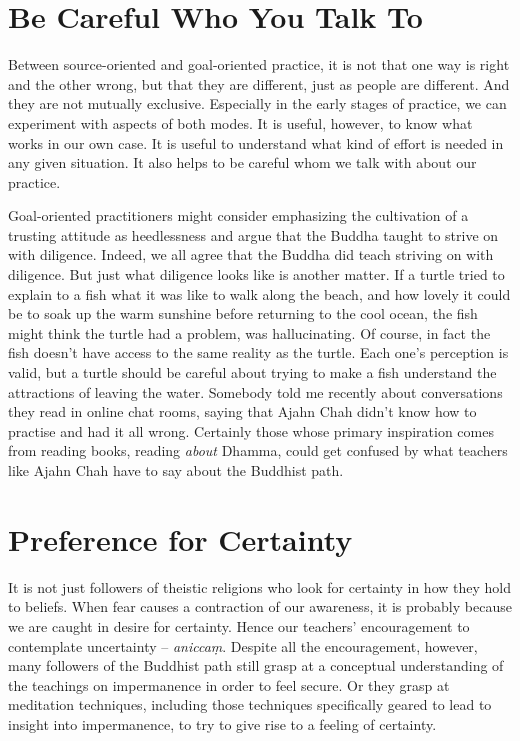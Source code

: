 \section{Be Careful Who You Talk To}

Between source-oriented and goal-oriented practice, it is not that one
way is right and the other wrong, but that they are different, just as
people are different. And they are not mutually exclusive. Especially in
the early stages of practice, we can experiment with aspects of both
modes. It is useful, however, to know what works in our own case. It is
useful to understand what kind of effort is needed in any given
situation. It also helps to be careful whom we talk with about our
practice.

Goal-oriented practitioners might consider emphasizing the cultivation
of a trusting attitude as heedlessness and argue that the Buddha taught
to strive on with diligence. Indeed, we all agree that the Buddha did
teach striving on with diligence. But just what diligence looks like is
another matter. If a turtle tried to explain to a fish what it was like
to walk along the beach, and how lovely it could be to soak up the warm
sunshine before returning to the cool ocean, the fish might think the
turtle had a problem, was hallucinating. Of course, in fact the fish
doesn’t have access to the same reality as the turtle. Each one’s
perception is valid, but a turtle should be careful about trying to make
a fish understand the attractions of leaving the water. Somebody told me
recently about conversations they read in online chat rooms, saying
that Ajahn Chah didn’t know how to practise and had it all wrong.
Certainly those whose primary inspiration comes from reading books,
reading \emph{about} Dhamma, could get confused by what teachers like Ajahn
Chah have to say about the Buddhist path.

\section{Preference for Certainty}

It is not just followers of theistic religions who look for certainty in
how they hold to beliefs. When fear causes a contraction of our
awareness, it is probably because we are caught in desire for certainty.
Hence our teachers’ encouragement to contemplate uncertainty –
\emph{aniccaṃ}. Despite all the encouragement, however, many followers of the
Buddhist path still grasp at a conceptual understanding of the teachings
on impermanence in order to feel secure. Or they grasp at meditation
techniques, including those techniques specifically geared to lead to
insight into impermanence, to try to give rise to a feeling of
certainty.

